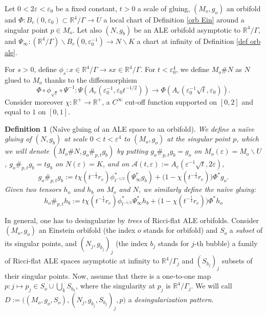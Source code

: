 \documentclass[11pt,reqno]{amsart}
\numberwithin{equation}{section}
\newtheorem{defn}[thm]{Definition}
\theoremstyle{definition}
\theoremstyle{remark}
\begin{document}
    Let $0<2\varepsilon<\varepsilon_0$ be a fixed constant, $t>0$ a scale of gluing, $(M_o,g_o)$ an orbifold and $\Phi: B_e(0,\varepsilon_0)\subset\mathbb{R}^4\slash\Gamma \to U$ a local chart of Definition \ref{orb Ein} around a singular point $p\in M_o$. Let also $(N,g_b)$ be an ALE orbifold asymptotic to $\mathbb{R}^4\slash\Gamma$, and $\Psi_\infty: (\mathbb{R}^4\slash\Gamma)\backslash B_e(0,\varepsilon_0^{-1}) \to N\backslash K$ a chart at infinity of Definition \ref{def orb ale}.
    
    For $s>0$, define $\phi_s: x\in \mathbb{R}^4\slash\Gamma\to sx \in \mathbb{R}^4\slash\Gamma$. For $t<\varepsilon_0^4$, we define $M_o\#N$ as $N$ glued to $M_o$ thanks to the diffeomorphism $$ \Phi\circ\phi_{\sqrt{t}}\circ\Psi^{-1} : \Psi(A_e(\varepsilon_0^{-1},\varepsilon_0t^{-1/2}))\to \Phi(A_e(\varepsilon_0^{-1}\sqrt{t},\varepsilon_0)).$$ Consider moreover $\chi:\mathbb{R}^+\to\mathbb{R}^+$, a $C^\infty$ cut-off function supported on $[0,2]$ and equal to $1$ on $[0,1]$.
    
\begin{defn}[Naïve gluing of an ALE space to an orbifold]\label{def naive desing}
    We define a \emph{naïve gluing} of $(N,g_b)$ at scale $0<t<\varepsilon^4$ to $(M_o,g_o)$ at the singular point $p$, which we will denote $(M_o\#N,g_o\#_{p,t}g_b)$ by putting $g_o\#_{p,t}g_b=g_o$ on $M_o(\varepsilon)=M_o\backslash U$, $g_o\#_{p,t}g_b=tg_b$ on $N(\varepsilon)=K$, and on $\mathcal{A}(t,\varepsilon):=A_e(\varepsilon^{-1}\sqrt{t},2\varepsilon)$,
    \begin{equation}\label{naive gluing metrics}
        g_o\#_{p,t}g_b :=  t\chi(t^{-\frac14}r_e)\phi_{t^{-1/2}}^*(\Psi_\infty^*g_b) + \Big(1-\chi(t^{-\frac14}r_e)\Big)\Phi^*g_o.
    \end{equation}
    Given two tensors $h_o$ and $h_b$ on $M_o$ and $N$, we similarly define the \textit{naïve gluing}:
    \begin{equation}\label{naive gluing tensors}
        h_o\#_{p,t}h_b := t \chi(t^{-\frac14}r_e)\phi_{t^{-1/2}}^*\Psi_\infty^*h_b + \Big(1-\chi(t^{-\frac14}r_e)\Big)\Phi^*h_o
    \end{equation}
\end{defn}


In general, one has to desingularize by \textit{trees} of Ricci-flat ALE orbifolds. Consider $(M_o,g_o)$ an Einstein orbifold (the index $o$ stands for orbifold) and $S_o$ a \textit{subset} of its singular points, and $(N_j,g_{b_j})_j$ (the index $b_j$ stands for $j$-th bubble) a family of Ricci-flat ALE spaces asymptotic at infinity to $\mathbb{R}^4\slash\Gamma_j$ and $(S_{b_j})_j$ subsets of their singular points. Now, assume that there is a one-to-one map  $p:j\mapsto p_j\in S_o\cup \bigcup_k S_{b_k}$, where the singularity at $p_j$ is $\mathbb{R}^4\slash\Gamma_j$. We will call $D:= \big((M_o,g_o,S_o),(N_j,g_{b_j},S_{b_j})_j, p\big)$ a \emph{desingularization pattern}.
\end{document}
